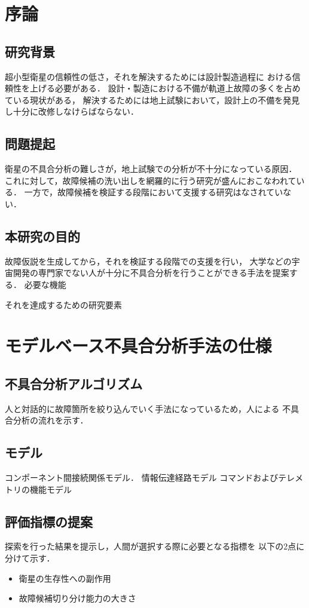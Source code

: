 \documentclass[11pt]{jsarticle}%
\begin{document}
\begin{multicols}{2}
  \section{序論}

  \subsection{研究背景}
  超小型衛星の信頼性の低さ，それを解決するためには設計製造過程に
  おける信頼性を上げる必要がある．
  設計・製造における不備が軌道上故障の多くを占めている現状がある，
  解決するためには地上試験において，設計上の不備を発見し十分に改修しなけらばならない．

  
  \subsection{問題提起}
  衛星の不具合分析の難しさが，地上試験での分析が不十分になっている原因．
  これに対して，故障候補の洗い出しを網羅的に行う研究が盛んにおこなわれている．
  一方で，故障候補を検証する段階において支援する研究はなされていない．

  \subsection{本研究の目的}
  故障仮説を生成してから，それを検証する段階での支援を行い，
  大学などの宇宙開発の専門家でない人が十分に不具合分析を行うことができる手法を提案する．
  必要な機能

  それを達成するための研究要素

  \section{モデルベース不具合分析手法の仕様}
  \subsection{不具合分析アルゴリズム}
  人と対話的に故障箇所を絞り込んでいく手法になっているため，人による
  不具合分析の流れを示す．


  \subsection{モデル}
  コンポーネント間接続関係モデル．
  情報伝達経路モデル
  コマンドおよびテレメトリの機能モデル%

  \subsection{評価指標の提案}
  探索を行った結果を提示し，人間が選択する際に必要となる指標を
  以下の2点に分けて示す．
  \begin{itemize}
    \item 衛星の生存性への副作用
    \item 故障候補切り分け能力の大きさ
  \end{itemize}


\end{multicols}
\end{document}
